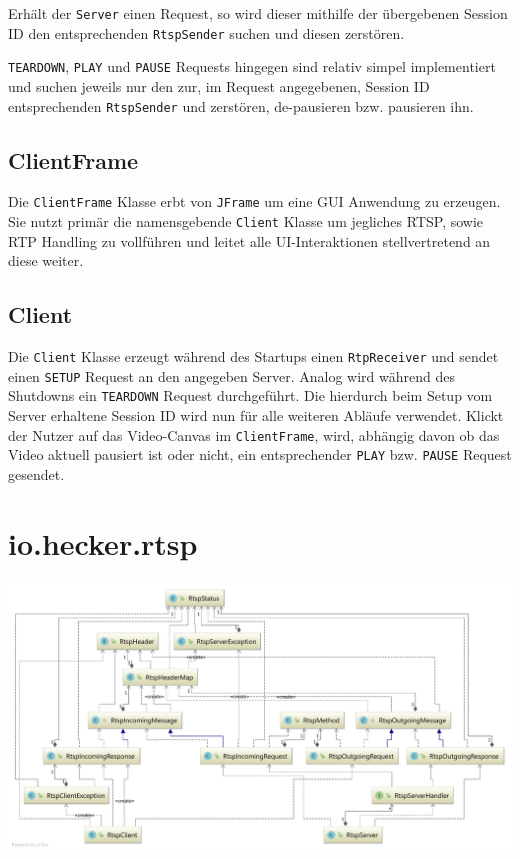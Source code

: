 \documentclass[a4paper,12pt]{article}
\begin{document}
Erhält der \texttt{Server} einen Request, so wird dieser mithilfe der übergebenen Session ID den entsprechenden \texttt{RtspSender} suchen und diesen zerstören.

\texttt{TEARDOWN}, \texttt{PLAY} und \texttt{PAUSE} Requests hingegen sind relativ simpel implementiert und suchen jeweils nur den zur, im Request angegebenen, Session ID entsprechenden \texttt{RtspSender} und zerstören, de-pausieren bzw. pausieren ihn.

\subsection{ClientFrame}

Die \texttt{ClientFrame} Klasse erbt von \texttt{JFrame} um eine GUI Anwendung zu erzeugen.
Sie nutzt primär die namensgebende \texttt{Client} Klasse um jegliches RTSP, sowie RTP Handling zu vollführen und leitet alle UI-Interaktionen stellvertretend an diese weiter.

\subsection{Client}
Die \texttt{Client} Klasse erzeugt während des Startups einen \texttt{RtpReceiver} und sendet einen \texttt{SETUP} Request an den angegeben Server.
Analog wird während des Shutdowns ein \texttt{TEARDOWN} Request durchgeführt.
Die hierdurch beim Setup vom Server erhaltene Session ID wird nun für alle weiteren Abläufe verwendet.
Klickt der Nutzer auf das Video-Canvas im \texttt{ClientFrame}, wird, abhängig davon ob das Video aktuell pausiert ist oder nicht, ein entsprechender \texttt{PLAY} bzw. \texttt{PAUSE} Request gesendet.

\clearpage
\section{io.hecker.rtsp}

\includegraphics[width=\textwidth]{assets/rtsp.pdf}
\end{document}

